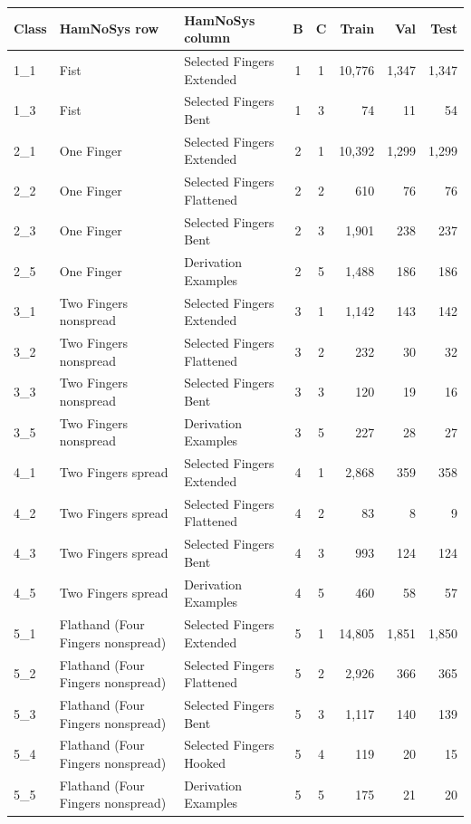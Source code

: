 \begin{tabular}{lllccrrr}
\toprule
\textbf{Class} & \textbf{HamNoSys row} & \textbf{HamNoSys column} & \textbf{B} & \textbf{C} & \textbf{Train} & \textbf{Val} & \textbf{Test} \\
\midrule
1\_1 & Fist & Selected Fingers Extended & 1 & 1 & 10,776 & 1,347 & 1,347 \\
1\_3 & Fist & Selected Fingers Bent & 1 & 3 & 74 & 11 & 54 \\
2\_1 & One Finger & Selected Fingers Extended & 2 & 1 & 10,392 & 1,299 & 1,299 \\
2\_2 & One Finger & Selected Fingers Flattened & 2 & 2 & 610 & 76 & 76 \\
2\_3 & One Finger & Selected Fingers Bent & 2 & 3 & 1,901 & 238 & 237 \\
2\_5 & One Finger & Derivation Examples & 2 & 5 & 1,488 & 186 & 186 \\
3\_1 & Two Fingers nonspread & Selected Fingers Extended & 3 & 1 & 1,142 & 143 & 142 \\
3\_2 & Two Fingers nonspread & Selected Fingers Flattened & 3 & 2 & 232 & 30 & 32 \\
3\_3 & Two Fingers nonspread & Selected Fingers Bent & 3 & 3 & 120 & 19 & 16 \\
3\_5 & Two Fingers nonspread & Derivation Examples & 3 & 5 & 227 & 28 & 27 \\
4\_1 & Two Fingers spread & Selected Fingers Extended & 4 & 1 & 2,868 & 359 & 358 \\
4\_2 & Two Fingers spread & Selected Fingers Flattened & 4 & 2 & 83 & 8 & 9 \\
4\_3 & Two Fingers spread & Selected Fingers Bent & 4 & 3 & 993 & 124 & 124 \\
4\_5 & Two Fingers spread & Derivation Examples & 4 & 5 & 460 & 58 & 57 \\
5\_1 & Flathand (Four Fingers nonspread) & Selected Fingers Extended & 5 & 1 & 14,805 & 1,851 & 1,850 \\
5\_2 & Flathand (Four Fingers nonspread) & Selected Fingers Flattened & 5 & 2 & 2,926 & 366 & 365 \\
5\_3 & Flathand (Four Fingers nonspread) & Selected Fingers Bent & 5 & 3 & 1,117 & 140 & 139 \\
5\_4 & Flathand (Four Fingers nonspread) & Selected Fingers Hooked & 5 & 4 & 119 & 20 & 15 \\
5\_5 & Flathand (Four Fingers nonspread) & Derivation Examples & 5 & 5 & 175 & 21 & 20 \\

\end{tabular}
